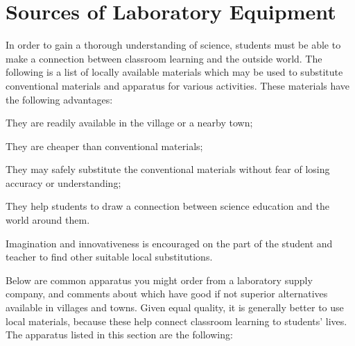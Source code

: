 \chapter{Sources of Laboratory Equipment} 
\label{cha:labequip}
In order to gain a thorough understanding of science, students must be able to make a connection between classroom learning and the outside world. The following is a list of locally available materials which may be used to substitute conventional materials and apparatus for various activities. These materials have the following advantages: 
\begin{itemize*}
\item They are readily available in the village or a nearby town;
\item They are cheaper than conventional materials; 
\item They may safely substitute the conventional materials without fear of losing accuracy or understanding; 
\item They help students to draw a connection between science education and the world around them.
\end{itemize*}
Imagination and innovativeness is encouraged on the part of the student and teacher to find other suitable local substitutions. 



Below are common apparatus you might order from a laboratory supply company, 
and comments about which have good if not superior alternatives 
available in villages and towns. 
Given equal quality, 
it is generally better to use local materials, 
because these help connect classroom learning to students' lives.\\

The apparatus listed in this section are the following:

